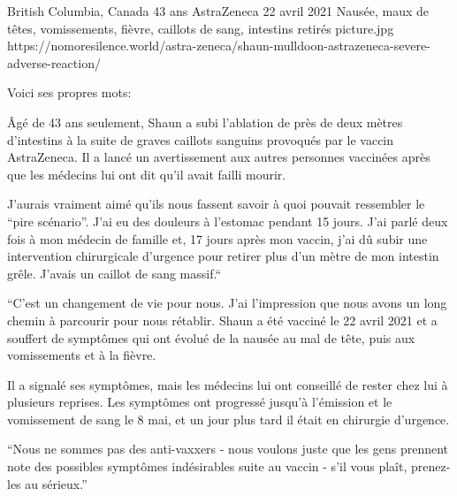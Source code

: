 {British Columbia, Canada}
{43 ans}
{AstraZeneca}
{22 avril 2021}
{Nausée, maux de têtes, vomissements, fièvre, caillots de sang, intestins retirés}
{picture.jpg}
{https://nomoresilence.world/astra-zeneca/shaun-mulldoon-astrazeneca-severe-adverse-reaction/}
{

Voici ses propres mots:

Âgé de 43 ans seulement, Shaun a subi l'ablation de près de deux mètres
d'intestins à la suite de graves caillots sanguins provoqués par le vaccin
AstraZeneca. Il a lancé un avertissement aux autres personnes vaccinées après
que les médecins lui ont dit qu'il avait failli mourir.

J'aurais vraiment aimé qu'ils nous fassent savoir à quoi pouvait ressembler le
“pire scénario”. J'ai eu des douleurs à l'estomac pendant 15 jours. J'ai parlé
deux fois à mon médecin de famille et, 17 jours après mon vaccin, j'ai dû subir
une intervention chirurgicale d'urgence pour retirer plus d'un mètre de mon
intestin grêle. J'avais un caillot de sang massif.“

“C'est un changement de vie pour nous. J'ai l'impression que nous avons un long
chemin à parcourir pour nous rétablir. Shaun a été vacciné le 22 avril 2021 et a
souffert de symptômes qui ont évolué de la nausée au mal de tête, puis aux
vomissements et à la fièvre.

Il a signalé ses symptômes, mais les médecins lui ont conseillé de rester chez
lui à plusieurs reprises. Les symptômes ont progressé jusqu'à l'émission et le
vomissement de sang le 8 mai, et un jour plus tard il était en chirurgie
d'urgence.

“Nous ne sommes pas des anti-vaxxers - nous voulons juste que les gens prennent
note des possibles symptômes indésirables suite au vaccin - s'il vous plaît,
prenez-les au sérieux.”

}

